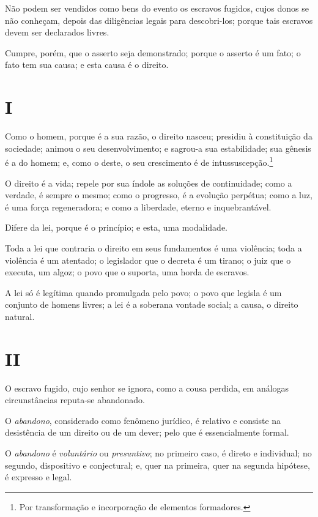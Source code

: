 {Não podem ser vendidos como bens do evento os escravos fugidos, cujos
donos se não conheçam, depois das diligências legais para descobri-los;
porque tais escravos devem ser declarados livres.

Cumpre, porém, que o asserto seja demonstrado; porque o asserto é um
fato; o fato tem sua causa; e esta causa é o direito.

\section*{I}

Como o homem, porque é a sua razão, o direito nasceu; presidiu à
constituição da sociedade; animou o seu desenvolvimento; e sagrou-a sua
estabilidade; sua gênesis é a do homem; e, como o deste, o seu
crescimento é de intussuscepção.\footnote{Por transformação e
  incorporação de elementos formadores.}

O direito é a vida; repele por sua índole as soluções de continuidade;
como a verdade, é sempre o mesmo; como o progresso, é a evolução
perpétua; como a luz, é uma força regeneradora; e como a liberdade,
eterno e inquebrantável.

Difere da lei, porque é o princípio; e esta, uma modalidade.

Toda a lei que contraria o direito em seus fundamentos é uma violência;
toda a violência é um atentado; o legislador que o decreta é um tirano;
o juiz que o executa, um algoz; o povo que o suporta, uma horda de
escravos.

A lei só é legítima quando promulgada pelo povo; o povo que legisla é um
conjunto de homens livres; a lei é a soberana vontade social; a causa, o
direito natural.

\section*{II}

O escravo fugido, cujo senhor se ignora, como a cousa perdida, em
análogas circunstâncias reputa-se abandonado.

O \emph{abandono}, considerado como fenômeno jurídico, é relativo e
consiste na desistência de um direito ou de um dever; pelo que é
essencialmente formal.

O \emph{abandono} é \emph{voluntário} ou \emph{presuntivo}; no primeiro
caso, é direto e individual; no segundo, dispositivo e conjectural; e,
quer na primeira, quer na segunda hipótese, é expresso e legal.

}

